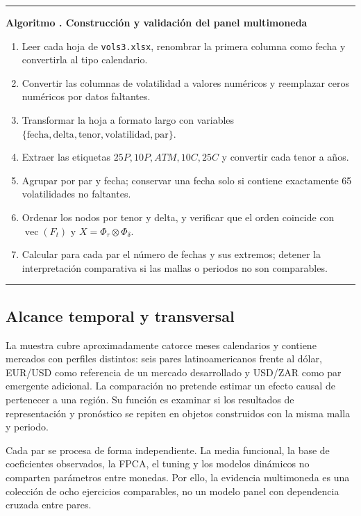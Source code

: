 \documentclass[a4paper,11pt]{article}
\newcounter{algoritmotesis}
\newenvironment{algoritmotesis}[1]{%
  \refstepcounter{algoritmotesis}%
  \par\medskip
  \noindent\begin{minipage}{\linewidth}
  \hrule\vspace{0.6em}
  \textbf{Algoritmo \thealgoritmotesis. #1}
  \begin{enumerate}
}{%
  \end{enumerate}
  \vspace{0.2em}\hrule
  \end{minipage}
  \par\medskip
}
\begin{document}
\begin{algoritmotesis}{Construcción y validación del panel multimoneda}
  \item Leer cada hoja de \texttt{vols3.xlsx}, renombrar la primera columna como fecha y convertirla al tipo calendario.
  \item Convertir las columnas de volatilidad a valores numéricos y reemplazar ceros numéricos por datos faltantes.
  \item Transformar la hoja a formato largo con variables \(\{\text{fecha},\text{delta},\text{tenor},\text{volatilidad},\text{par}\}\).
  \item Extraer las etiquetas \(25P,10P,ATM,10C,25C\) y convertir cada tenor a años.
  \item Agrupar por par y fecha; conservar una fecha solo si contiene exactamente 65 volatilidades no faltantes.
  \item Ordenar los nodos por tenor y delta, y verificar que el orden coincide con \(\operatorname{vec}(F_t)\) y \(X=\Phi_\tau\otimes\Phi_\delta\).
  \item Calcular para cada par el número de fechas y sus extremos; detener la interpretación comparativa si las mallas o periodos no son comparables.
\end{algoritmotesis}

\subsection{Alcance temporal y transversal}

La muestra cubre aproximadamente catorce meses calendarios y contiene mercados con perfiles distintos: seis pares latinoamericanos frente al dólar, EUR/USD como referencia de un mercado desarrollado y USD/ZAR como par emergente adicional. La comparación no pretende estimar un efecto causal de pertenecer a una región. Su función es examinar si los resultados de representación y pronóstico se repiten en objetos construidos con la misma malla y periodo.

Cada par se procesa de forma independiente. La media funcional, la base de coeficientes observados, la FPCA, el tuning y los modelos dinámicos no comparten parámetros entre monedas. Por ello, la evidencia multimoneda es una colección de ocho ejercicios comparables, no un modelo panel con dependencia cruzada entre pares.
\end{document}
